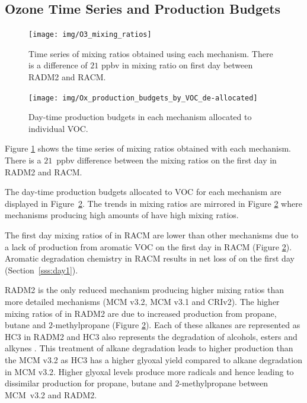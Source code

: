%
\subsection[O3 Time Series and Ox Production Budgets]{Ozone Time Series and  Production Budgets} \label{ss:O3_time_series}

\begin{figure}
    \centering
    \texttt{[image: img/O3\_mixing\_ratios]}
    \vspace{0mm}
    \caption{Time series of  mixing ratios obtained using each mechanism. There is a difference of $21$ ppbv in  mixing ratio on first day between RADM2 and RACM.}
    \vspace{-4mm}
    \label{f:time_series}
\end{figure}

\begin{figure}
    \centering
    \texttt{[image: img/Ox\_production\_budgets\_by\_VOC\_de-allocated]}
    \vspace{1mm}
    \caption{Day-time  production budgets in each mechanism allocated to individual VOC.}
    \vspace{-4mm}
    \label{f:Ox_tagged_budgets}
\end{figure}

Figure \ref{f:time_series} shows the time series of  mixing ratios obtained with each mechanism.
There is a \mbox{$21$ ppbv} difference between the  mixing ratios on the first day in RADM2 and RACM.

The day-time  production budgets allocated to VOC for each mechanism are displayed in \mbox{Figure \ref{f:Ox_tagged_budgets}}.
The trends in  mixing ratios are mirrored in Figure \ref{f:Ox_tagged_budgets} where mechanisms producing high amounts of  have high  mixing ratios.

The first day mixing ratios of  in RACM are lower than other mechanisms due to a lack of  production from aromatic VOC on the first day in RACM (Figure \ref{f:Ox_tagged_budgets}).
Aromatic degradation chemistry in RACM results in net loss of  on the first day (\mbox{Section \ref{sss:day1}}).

RADM2 is the only reduced mechanism producing higher  mixing ratios than more detailed mechanisms (MCM v3.2, MCM v3.1 and CRIv2).
The higher mixing ratios of  in RADM2 are due to increased  production from propane, butane and $2$-methylpropane (Figure \ref{f:Ox_tagged_budgets}).
Each of these alkanes are represented as HC3 in RADM2 and HC3 also represents the degradation of alcohols, esters and alkynes \citep{Stockwell:1990}.
This treatment of alkane degradation leads to higher  production than the MCM v3.2 as HC3 has a higher glyoxal yield compared to alkane degradation in MCM v3.2.
Higher glyoxal levels produce more radicals and hence  leading to dissimilar  production for propane, butane and $2$-methylpropane between \mbox{MCM v3.2} and RADM2.

